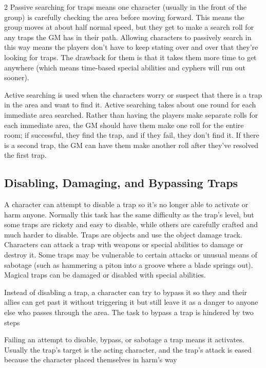 \begin{multicols}{2}
Passive searching for traps means one character (usually in the front of the group) is carefully checking the area before moving forward. This means the group moves at about half normal speed, but they get to make a search roll for any traps the GM has in their path. Allowing characters to passively search in this way means the players don’t have to keep stating over and over that they’re looking for traps. The drawback for them is that it takes them more time to get anywhere (which means time-based special abilities and cyphers will run out sooner).

Active searching is used when the characters worry or suspect that there is a trap in the area and want to find it. Active searching takes about one round for each immediate area searched. Rather than having the players make separate rolls for each immediate area, the GM should have them make one roll for the entire room; if successful, they find the trap, and if they fail, they don’t find it. If there is a second trap, the GM can have them make another roll after they’ve resolved the first trap.

\subsection{Disabling, Damaging, and Bypassing Traps}

A character can attempt to disable a trap so it’s no longer able to activate or harm anyone. Normally this task has the same difficulty as the trap’s level, but some traps are rickety and easy to disable, while others are carefully crafted and much harder to disable. Traps are objects and use the object damage track. Characters can attack a trap with weapons or special abilities to damage or destroy it. Some traps may be vulnerable to certain attacks or unusual means of sabotage (such as hammering a piton into a groove where a blade springs out). Magical traps can be damaged or disabled with special abilities.

Instead of disabling a trap, a character can try to bypass it so they and their allies can get past it without triggering it but still leave it as a danger to anyone else who passes through the area. The task to bypass a trap is hindered by two steps

Failing an attempt to disable, bypass, or sabotage a trap means it activates. Usually the trap’s target is the acting character, and the trap’s attack is eased because the character placed themselves in harm’s way


\end{multicols}
